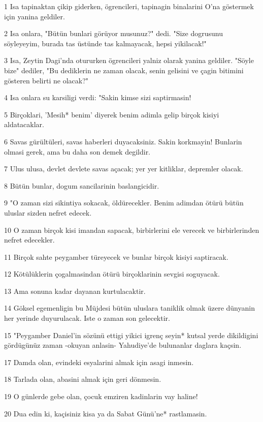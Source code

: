 \par 1 Isa tapinaktan çikip giderken, ögrencileri, tapinagin binalarini O'na göstermek için yanina geldiler.
\par 2 Isa onlara, "Bütün bunlari görüyor musunuz?" dedi. "Size dogrusunu söyleyeyim, burada tas üstünde tas kalmayacak, hepsi yikilacak!"
\par 3 Isa, Zeytin Dagi'nda otururken ögrencileri yalniz olarak yanina geldiler. "Söyle bize" dediler, "Bu dediklerin ne zaman olacak, senin gelisini ve çagin bitimini gösteren belirti ne olacak?"
\par 4 Isa onlara su karsiligi verdi: "Sakin kimse sizi saptirmasin!
\par 5 Birçoklari, 'Mesih* benim' diyerek benim adimla gelip birçok kisiyi aldatacaklar.
\par 6 Savas gürültüleri, savas haberleri duyacaksiniz. Sakin korkmayin! Bunlarin olmasi gerek, ama bu daha son demek degildir.
\par 7 Ulus ulusa, devlet devlete savas açacak; yer yer kitliklar, depremler olacak.
\par 8 Bütün bunlar, dogum sancilarinin baslangicidir.
\par 9 "O zaman sizi sikintiya sokacak, öldürecekler. Benim adimdan ötürü bütün uluslar sizden nefret edecek.
\par 10 O zaman birçok kisi imandan sapacak, birbirlerini ele verecek ve birbirlerinden nefret edecekler.
\par 11 Birçok sahte peygamber türeyecek ve bunlar birçok kisiyi saptiracak.
\par 12 Kötülüklerin çogalmasindan ötürü birçoklarinin sevgisi soguyacak.
\par 13 Ama sonuna kadar dayanan kurtulacaktir.
\par 14 Göksel egemenligin bu Müjdesi bütün uluslara taniklik olmak üzere dünyanin her yerinde duyurulacak. Iste o zaman son gelecektir.
\par 15 "Peygamber Daniel'in sözünü ettigi yikici igrenç seyin* kutsal yerde dikildigini gördügünüz zaman -okuyan anlasin- Yahudiye'de bulunanlar daglara kaçsin.
\par 17 Damda olan, evindeki esyalarini almak için asagi inmesin.
\par 18 Tarlada olan, abasini almak için geri dönmesin.
\par 19 O günlerde gebe olan, çocuk emziren kadinlarin vay haline!
\par 20 Dua edin ki, kaçisiniz kisa ya da Sabat Günü'ne* rastlamasin.

